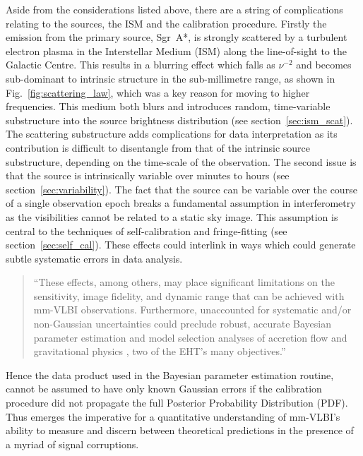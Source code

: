Aside from the considerations listed above, there are a string of complications relating to the sources, the ISM and the calibration procedure. 
Firstly the emission from the primary source, Sgr~A*, is strongly scattered by a turbulent electron plasma in the Interstellar Medium (ISM) along the line-of-sight to the Galactic Centre. This results in a blurring effect \citep[e.g.][]{Fish_2014} which falls as $\nu^{-2}$ and becomes sub-dominant to intrinsic structure in the sub-millimetre range, as shown in Fig.~\ref{fig:scattering_law}, which was a key reason for moving to higher frequencies. This medium both blurs and introduces random, time-variable substructure into the source brightness distribution (see section~\ref{sec:ism_scat}). The scattering substructure adds complications for data interpretation as its contribution is difficult to disentangle from that of the intrinsic source substructure, depending on the time-scale of the observation.
The second issue is that the source is intrinsically variable over minutes to hours (see section~\ref{sec:variability}). The fact that the source can be variable over the course of a single observation epoch breaks a fundamental assumption in interferometry as the visibilities cannot be related to a static sky image. This assumption is central to the techniques of self-calibration and fringe-fitting (see section~\ref{sec:self_cal}).
These effects could interlink in ways which could generate subtle systematic errors in data analysis. 


\begin{quotation}
``These effects, among others, may place significant limitations on the sensitivity, image fidelity, and dynamic range that can be achieved with mm-VLBI observations.  Furthermore, unaccounted for systematic and/or non-Gaussian uncertainties could preclude robust, accurate Bayesian parameter estimation and model selection analyses of accretion flow \citep[e.g.][]{Broderick_2016} and gravitational physics \citep[e.g.][]{Broderick_2014, Psaltis_2016}, two of the EHT's many objectives.''\\
\citep{Blecher_2016}
\end{quotation}


Hence the data product used in the Bayesian parameter estimation routine, cannot be assumed to have only known Gaussian errors if the calibration procedure did not propagate the full Posterior Probability Distribution (PDF). Thus emerges the imperative for a quantitative understanding of mm-VLBI's ability to measure and discern between theoretical predictions in the presence of a myriad of signal corruptions.

